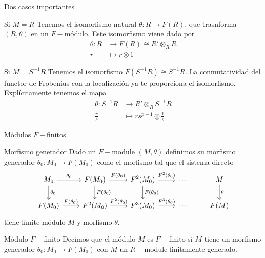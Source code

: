 \documentclass{beamer}
\begin{document}
\begin{frame}[fragile]{Dos casos importantes}
\begin{block}{Si $M = R$}
  Tenemos el isomorfismo natural $\theta :R \to F(R)$, que trasnforma $(R, \theta )$ en un $F-$módulo. Este isomorfismo viene dado por
  \begin{align*}
	\theta : R &\to F(R)\cong R' \otimes _R R \\
	r &\mapsto r \otimes 1
  \end{align*}
\end{block}
\begin{block}{Si $M = S^{-1}R$}
Tenemos el isomorfismo $F(S^{-1}R)\cong S^{-1}R$. La conmutatividad del functor de Frobenius con la localización ya te proporciona el isomorfismo. Explícitamente tenemos el mapa
   \begin{align*}
	\theta : S ^{-1}R & \to R'\otimes _R S ^{-1}R\\
	\frac{r}{s} &\mapsto rs ^{p-1} \otimes \frac{1}{s}
   \end{align*}
\end{block}
\end{frame}


\begin{frame}[fragile]{Módulos $F-$finitos}
\begin{block}{Morfismo generador}
Dado un $F-$module  $(M, \theta )$ definimos su morfismo generador $\theta_0 :M_0 \to F(M_0)$ como el morfismo tal que el sistema directo
\[\begin{tikzcd}
	{M_0} & {F(M_0)} & {F^2(M_0)} & \cdots & M \\
	{F(M_0)} & {F^2(M_0)} & {F^3(M_0)} & \cdots & {F(M)}
	\arrow["{\theta_0}", from=1-1, to=1-2]
	\arrow["{F(\theta_0)}", from=2-1, to=2-2]
	\arrow["{F^2(\theta_0)}", from=2-2, to=2-3]
	\arrow["{F(\theta_0)}", from=1-2, to=1-3]
	\arrow["{\theta_0}", from=1-1, to=2-1]
	\arrow["{F(\theta_0)}", from=1-2, to=2-2]
	\arrow["{F(\theta_0)}", from=1-3, to=2-3]
	\arrow["{F^2(\theta_0)}", from=1-3, to=1-4]
	\arrow["{F^3(\theta_0)}", from=2-3, to=2-4]
	\arrow["\theta", from=1-5, to=2-5]
\end{tikzcd}\]
tiene límite módulo $M$ y morfismo $\theta$.
\end{block}
\begin{block}{Módulo $F-$finito}
Decimos que el módulo $M$ es $F-$finito si $M$ tiene un morfismo generador $\theta _0 : M_0 \to F(M_0)$ con $M$ un $R-$module finitamente generado.
\end{block}
\end{frame}
\end{document}
